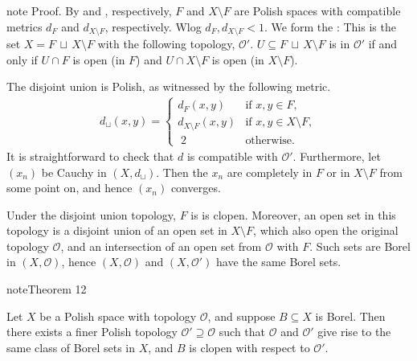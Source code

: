 \documentclass[letterpaper,10pt,english]{jupyterBook}
\begin{document}
\begin{sphinxadmonition}{note}
\sphinxAtStartPar
Proof. By {\hyperref[\detokenize{polish:properties-polish}]{}} and {\hyperref[\detokenize{subsets_Polish:prop-open-subset-Polish}]{}}, respectively, \(F\) and \(X \setminus F\) are Polish spaces with compatible metrics \(d_F\) and \(d_{X\setminus F}\),  respectively. Wlog \(d_F, d_{X\setminus F} < 1\). We form the : This is the set \(X = F \,\sqcup\, X \setminus F\) with the following topology, \(\mathcal{O}'\). \(U \subseteq F \,\sqcup\, X \setminus F\) is in \(\mathcal{O}'\) if and only if \(U \cap F\) is open (in \(F\)) and  \(U \cap X\setminus F\) is open (in \(X\setminus F\)).

\sphinxAtStartPar
The disjoint union is Polish, as witnessed by the following metric.
\begin{equation*}
\begin{split}
    d_\sqcup(x,y) =  
    \begin{cases}
            d_F(x,y) &\text{if } x,y \in F, \\
            d_{X\setminus F}(x,y) &\text{if } x,y \in X\setminus F, \\
            \;  2  &\text{otherwise}.
    \end{cases}
\end{split}
\end{equation*}
\sphinxAtStartPar
It is straightforward to check that \(d\) is compatible with \(\mathcal{O}'\). Furthermore, let \((x_n)\) be Cauchy in \((X,d_\sqcup)\). Then the \(x_n\) are completely in \(F\) or in \(X\setminus F\) from some point on, and hence \((x_n)\) converges.

\sphinxAtStartPar
Under the disjoint union topology, \(F\) is is clopen. Moreover, an open set in this topology is a disjoint union of an open set in \(X\setminus F\), which also open the original topology \(\mathcal{O}\), and an intersection of an open set from \(\mathcal{O}\) with \(F\). Such sets are Borel in \((X,\mathcal{O})\), hence \((X,\mathcal{O})\) and \((X,\mathcal{O}')\) have the same Borel sets.
\end{sphinxadmonition}
\label{subsets_Polish:thm-Borel-clopen}
\begin{sphinxadmonition}{note}{Theorem 12}



\sphinxAtStartPar
Let \(X\) be a Polish space with topology \(\mathcal{O}\), and suppose \(B \subseteq X\) is Borel. Then there exists
a finer Polish topology \(\mathcal{O}' \supseteq \mathcal{O}\) such that \(\mathcal{O}\) and \(\mathcal{O}'\) give rise to the same class of Borel sets in \(X\), and \(B\) is clopen with respect to \(\mathcal{O}'\).
\end{sphinxadmonition}
\end{document}
